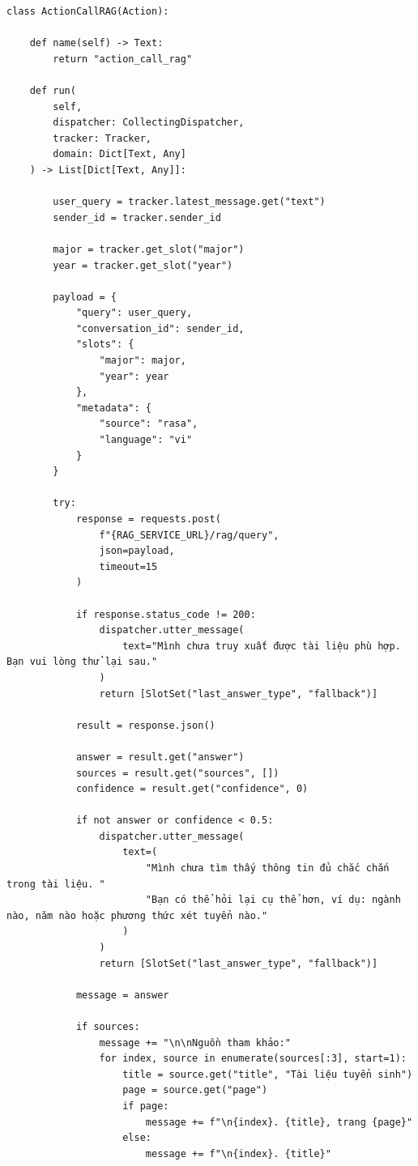 \begin{verbatim}
class ActionCallRAG(Action):

    def name(self) -> Text:
        return "action_call_rag"

    def run(
        self,
        dispatcher: CollectingDispatcher,
        tracker: Tracker,
        domain: Dict[Text, Any]
    ) -> List[Dict[Text, Any]]:

        user_query = tracker.latest_message.get("text")
        sender_id = tracker.sender_id

        major = tracker.get_slot("major")
        year = tracker.get_slot("year")

        payload = {
            "query": user_query,
            "conversation_id": sender_id,
            "slots": {
                "major": major,
                "year": year
            },
            "metadata": {
                "source": "rasa",
                "language": "vi"
            }
        }

        try:
            response = requests.post(
                f"{RAG_SERVICE_URL}/rag/query",
                json=payload,
                timeout=15
            )

            if response.status_code != 200:
                dispatcher.utter_message(
                    text="Mình chưa truy xuất được tài liệu phù hợp. Bạn vui lòng thử lại sau."
                )
                return [SlotSet("last_answer_type", "fallback")]

            result = response.json()

            answer = result.get("answer")
            sources = result.get("sources", [])
            confidence = result.get("confidence", 0)

            if not answer or confidence < 0.5:
                dispatcher.utter_message(
                    text=(
                        "Mình chưa tìm thấy thông tin đủ chắc chắn trong tài liệu. "
                        "Bạn có thể hỏi lại cụ thể hơn, ví dụ: ngành nào, năm nào hoặc phương thức xét tuyển nào."
                    )
                )
                return [SlotSet("last_answer_type", "fallback")]

            message = answer

            if sources:
                message += "\n\nNguồn tham khảo:"
                for index, source in enumerate(sources[:3], start=1):
                    title = source.get("title", "Tài liệu tuyển sinh")
                    page = source.get("page")
                    if page:
                        message += f"\n{index}. {title}, trang {page}"
                    else:
                        message += f"\n{index}. {title}"


\end{verbatim}
